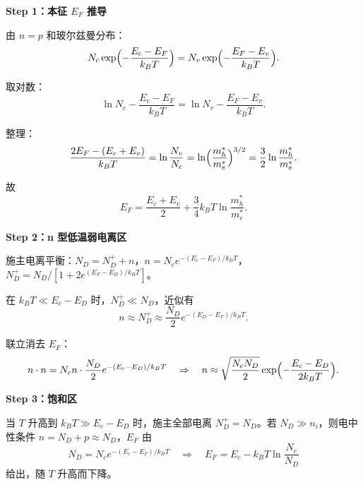 \begin{derivationbox}
\textbf{Step 1：本征 $E_F$ 推导}

由 $n=p$ 和玻尔兹曼分布：
\[
N_c\exp\Bigl(-\frac{E_c-E_F}{k_BT}\Bigr)=N_v\exp\Bigl(-\frac{E_F-E_v}{k_BT}\Bigr).
\]

取对数：
\[
\ln N_c-\frac{E_c-E_F}{k_BT}=\ln N_v-\frac{E_F-E_v}{k_BT}.
\]

整理：
\[
\frac{2E_F-(E_c+E_v)}{k_BT}=\ln\frac{N_v}{N_c}=\ln\Bigl(\frac{m_h^*}{m_e^*}\Bigr)^{3/2}=\frac{3}{2}\ln\frac{m_h^*}{m_e^*}.
\]

故
\[
E_F=\frac{E_c+E_v}{2}+\frac{3}{4}k_BT\ln\frac{m_h^*}{m_e^*}.
\]

\textbf{Step 2：n 型低温弱电离区}

施主电离平衡：$N_D=N_D^++n$，$n=N_c e^{-(E_c-E_F)/k_BT}$，$N_D^+=N_D/[1+2e^{(E_F-E_D)/k_BT}]$。

在 $k_BT\ll E_c-E_D$ 时，$N_D^+\ll N_D$，近似有
\[
n\approx N_D^+\approx\frac{N_D}{2}e^{-(E_D-E_F)/k_BT}.
\]

联立消去 $E_F$：
\[
n\cdot n=N_cn\cdot\frac{N_D}{2}e^{-(E_c-E_D)/k_BT}
\quad\Rightarrow\quad
n\approx\sqrt{\frac{N_cN_D}{2}}\exp\Bigl(-\frac{E_c-E_D}{2k_BT}\Bigr).
\]

\textbf{Step 3：饱和区}

当 $T$ 升高到 $k_BT\gg E_c-E_D$ 时，施主全部电离 $N_D^+=N_D$。若 $N_D\gg n_i$，则电中性条件 $n=N_D+p\approx N_D$，$E_F$ 由
\[
N_D=N_ce^{-(E_c-E_F)/k_BT}
\quad\Rightarrow\quad
E_F=E_c-k_BT\ln\frac{N_c}{N_D}
\]
给出，随 $T$ 升高而下降。
\end{derivationbox}

\vspace{1em}
